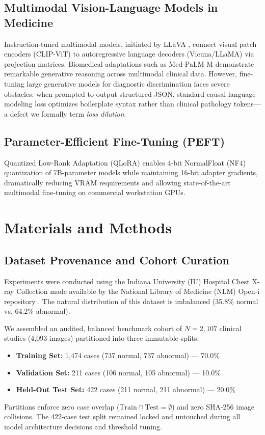 \documentclass[conference]{IEEEtran}
\begin{document}
\subsection{Multimodal Vision-Language Models in Medicine}
Instruction-tuned multimodal models, initiated by LLaVA \cite{liu2023visual}, connect visual patch encoders (CLIP-ViT) to autoregressive language decoders (Vicuna/LLaMA) via projection matrices. Biomedical adaptations such as Med-PaLM M \cite{tu2024towards} demonstrate remarkable generative reasoning across multimodal clinical data. However, fine-tuning large generative models for diagnostic discrimination faces severe obstacles: when prompted to output structured JSON, standard causal language modeling loss optimizes boilerplate syntax rather than clinical pathology tokens---a defect we formally term \textit{loss dilution}.

\subsection{Parameter-Efficient Fine-Tuning (PEFT)}
Quantized Low-Rank Adaptation (QLoRA) \cite{dettmers2023qlora, hu2021lora} enables 4-bit NormalFloat (NF4) quantization of 7B-parameter models while maintaining 16-bit adapter gradients, dramatically reducing VRAM requirements and allowing state-of-the-art multimodal fine-tuning on commercial workstation GPUs.

\section{Materials and Methods}
\subsection{Dataset Provenance and Cohort Curation}
Experiments were conducted using the Indiana University (IU) Hospital Chest X-ray Collection made available by the National Library of Medicine (NLM) Open-i repository \cite{demner2016preparing}. The natural distribution of this dataset is imbalanced (35.8\% normal vs. 64.2\% abnormal).

We assembled an audited, balanced benchmark cohort of $N = 2,107$ clinical studies (4,093 images) partitioned into three immutable splits:
\begin{itemize}
    \item \textbf{Training Set:} 1,474 cases (737 normal, 737 abnormal) --- 70.0\%
    \item \textbf{Validation Set:} 211 cases (106 normal, 105 abnormal) --- 10.0\%
    \item \textbf{Held-Out Test Set:} 422 cases (211 normal, 211 abnormal) --- 20.0\%
\end{itemize}
Partitions enforce zero case overlap ($\text{Train} \cap \text{Test} = \emptyset$) and zero SHA-256 image collisions. The 422-case test split remained locked and untouched during all model architecture decisions and threshold tuning.
\end{document}
